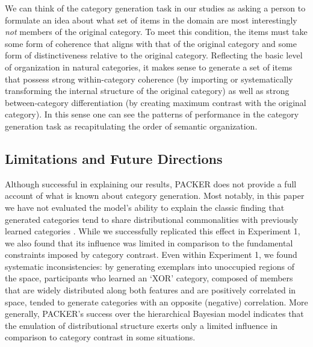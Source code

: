 \documentclass[12pt]{article}
\begin{document}
\begin{flushleft}
We can think of the category generation task in our studies as asking a person to formulate an idea about what set of items in the domain are most interestingly {\em not} members of the original category. To meet this condition, the items must take some form of coherence that aligns with that of the original category and some form of distinctiveness relative to the original category. Reflecting the basic level of organization in natural categories, it makes sense to generate a set of items that possess strong within-category coherence (by importing or systematically transforming the internal structure of the original category) as well as strong between-category differentiation (by creating maximum contrast with the original category). In this sense one can see the patterns of performance in the category generation task as recapitulating the order of semantic organization.

\subsection{Limitations and Future Directions}

Although successful in explaining our results, PACKER does not provide a full account of what is known about category generation. Most notably, in this paper we have not evaluated the model's ability to explain the classic finding that generated categories tend to share distributional commonalities with previously learned categories \citep[see][]{jern2013probabilistic,ward1994structured}. While we successfully replicated this effect in Experiment 1, we also found that its influence was limited in comparison to the fundamental constraints imposed by category contrast. Even within Experiment 1, we found systematic inconsistencies: by generating exemplars into unoccupied regions of the space, participants who learned an `XOR' category, composed of members that are widely distributed along both features and are positively correlated in space, tended to generate categories with an opposite (negative) correlation. More generally, PACKER's success over the hierarchical Bayesian model indicates that the emulation of distributional structure exerts only a limited influence in comparison to category contrast in some situations.


\end{flushleft}
\end{document}
